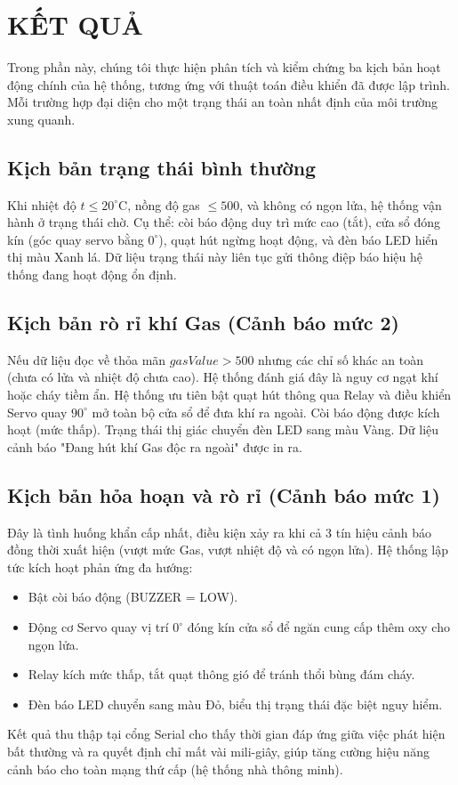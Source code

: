 \section{KẾT QUẢ}
Trong phần này, chúng tôi thực hiện phân tích và kiểm chứng ba kịch bản hoạt động chính của hệ thống, tương ứng với thuật toán điều khiển đã được lập trình. Mỗi trường hợp đại diện cho một trạng thái an toàn nhất định của môi trường xung quanh.

\subsection{Kịch bản trạng thái bình thường}
Khi nhiệt độ $t \le 20^\circ\text{C}$, nồng độ gas $\le 500$, và không có ngọn lửa, hệ thống vận hành ở trạng thái chờ. Cụ thể: còi báo động duy trì mức cao (tắt), cửa sổ đóng kín (góc quay servo bằng $0^\circ$), quạt hút ngừng hoạt động, và đèn báo LED hiển thị màu Xanh lá. Dữ liệu trạng thái này liên tục gửi thông điệp báo hiệu hệ thống đang hoạt động ổn định.

\subsection{Kịch bản rò rỉ khí Gas (Cảnh báo mức 2)}
Nếu dữ liệu đọc về thỏa mãn $gasValue > 500$ nhưng các chỉ số khác an toàn (chưa có lửa và nhiệt độ chưa cao). Hệ thống đánh giá đây là nguy cơ ngạt khí hoặc cháy tiềm ẩn.  
Hệ thống ưu tiên bật quạt hút thông qua Relay và điều khiển Servo quay $90^\circ$ mở toàn bộ cửa sổ để đưa khí ra ngoài. Còi báo động được kích hoạt (mức thấp). Trạng thái thị giác chuyển đèn LED sang màu Vàng. Dữ liệu cảnh báo "Đang hút khí Gas độc ra ngoài" được in ra.

\subsection{Kịch bản hỏa hoạn và rò rỉ (Cảnh báo mức 1)}
Đây là tình huống khẩn cấp nhất, điều kiện xảy ra khi cả 3 tín hiệu cảnh báo đồng thời xuất hiện (vượt mức Gas, vượt nhiệt độ và có ngọn lửa). Hệ thống lập tức kích hoạt phản ứng đa hướng:
\begin{itemize}
    \item Bật còi báo động (BUZZER = LOW).
    \item Động cơ Servo quay vị trí $0^\circ$ đóng kín cửa sổ để ngăn cung cấp thêm oxy cho ngọn lửa.
    \item Relay kích mức thấp, tắt quạt thông gió để tránh thổi bùng đám cháy.
    \item Đèn báo LED chuyển sang màu Đỏ, biểu thị trạng thái đặc biệt nguy hiểm.
\end{itemize}

Kết quả thu thập tại cổng Serial cho thấy thời gian đáp ứng giữa việc phát hiện bất thường và ra quyết định chỉ mất vài mili-giây, giúp tăng cường hiệu năng cảnh báo cho toàn mạng thứ cấp (hệ thống nhà thông minh).
